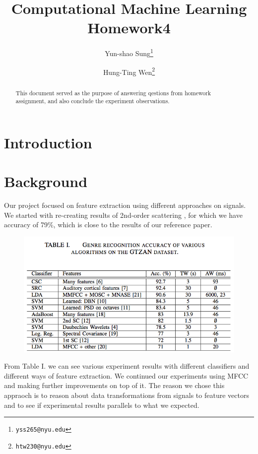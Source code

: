 \documentclass[final]{siamltexmm}
\title{Computational Machine Learning Homework4}
\author{Yun-shao Sung\thanks{\tt yss265@nyu.edu}
        \and Hung-Ting Wen\thanks{\tt htw230@nyu.edu}}
\begin{document}
\maketitle

\begin{abstract}
This document served as the purpose of answering qestions from homework assignment, and also conclude the experiment observations.
\end{abstract}

\pagestyle{myheadings}
\thispagestyle{plain}


\section{Introduction}

\section{Background}
Our project focused on feature extraction using different approaches on signals.  We started with re-creating results of 2nd-order scattering \cite{mgc} , for which we have accuracy of 79\%, which is close to the results of our reference paper.

\begin{figure}[ht]
  \begin{center}
    \includegraphics[scale=0.3]{../fig/refAccr.png}
  \end{center}
\end{figure}

From Table I. we can see various experiment results with different classifiers and different ways of feature extraction.  We continued our experiments using MFCC and making further improvements on top of it.  The reason we chose this appraoch is to reason about data transformations from signals to feature vectors and to see if experimental results parallels to what we expected.
\end{document}

